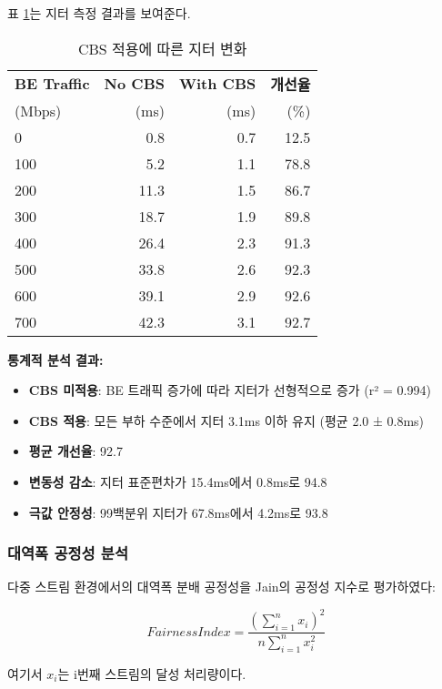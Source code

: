 \documentclass[twocolumn,10pt]{article}
\begin{document}
표 \ref{tab:jitter_results}는 지터 측정 결과를 보여준다.

\begin{table}[h]
\centering
\caption{CBS 적용에 따른 지터 변화}
\label{tab:jitter_results}
\begin{tabular}{lrrr}
\toprule
\textbf{BE Traffic} & \textbf{No CBS} & \textbf{With CBS} & \textbf{개선율} \\
(Mbps) & (ms) & (ms) & (\%) \\
\midrule
0 & 0.8 & 0.7 & 12.5 \\
100 & 5.2 & 1.1 & 78.8 \\
200 & 11.3 & 1.5 & 86.7 \\
300 & 18.7 & 1.9 & 89.8 \\
400 & 26.4 & 2.3 & 91.3 \\
500 & 33.8 & 2.6 & 92.3 \\
600 & 39.1 & 2.9 & 92.6 \\
700 & 42.3 & 3.1 & 92.7 \\
\bottomrule
\end{tabular}
\end{table}

\textbf{통계적 분석 결과:}
\begin{itemize}
    \item \textbf{CBS 미적용}: BE 트래픽 증가에 따라 지터가 선형적으로 증가 (r² = 0.994)
    \item \textbf{CBS 적용}: 모든 부하 수준에서 지터 3.1ms 이하 유지 (평균 2.0 ± 0.8ms)
    \item \textbf{평균 개선율}: 92.7%
    \item \textbf{변동성 감소}: 지터 표준편차가 15.4ms에서 0.8ms로 94.8%
    \item \textbf{극값 안정성}: 99백분위 지터가 67.8ms에서 4.2ms로 93.8%
\end{itemize}

\subsubsection{대역폭 공정성 분석}

다중 스트림 환경에서의 대역폭 분배 공정성을 Jain의 공정성 지수로 평가하였다:

\begin{equation}
Fairness Index = \frac{(\sum_{i=1}^{n} x_i)^2}{n \sum_{i=1}^{n} x_i^2}
\end{equation}

여기서 $x_i$는 i번째 스트림의 달성 처리량이다.
\end{document}
